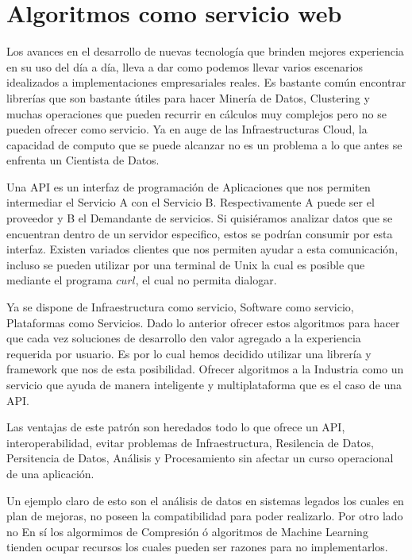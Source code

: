 \newpage
\section{Algoritmos como servicio web }

	Los avances en el desarrollo de nuevas tecnología que brinden mejores experiencia en su uso del día a día, lleva a dar como podemos llevar varios escenarios idealizados a implementaciones empresariales reales. Es bastante común encontrar librerías que son bastante útiles para hacer Minería de Datos, Clustering y muchas operaciones que pueden recurrir en cálculos muy complejos pero no se pueden ofrecer como servicio. Ya en auge de las Infraestructuras Cloud, la capacidad de computo que se puede alcanzar no es un problema a lo que antes se enfrenta un Cientista de Datos.


	Una API es un interfaz de programación de Aplicaciones que nos permiten intermediar el Servicio A con el Servicio B. Respectivamente A puede ser el proveedor y B el Demandante de servicios. Si quisiéramos analizar datos que se encuentran dentro de un servidor especifico, estos se podrían consumir por esta interfaz. Existen variados clientes que nos permiten ayudar a esta comunicación, incluso se pueden utilizar por una terminal de Unix la cual es posible que mediante el programa $curl$, el cual no permita dialogar.
	
	Ya se dispone de Infraestructura como servicio, Software como servicio, Plataformas como Servicios. Dado lo anterior ofrecer estos algoritmos para hacer que cada vez soluciones de desarrollo den valor agregado a la experiencia requerida por usuario. 
	Es por lo cual hemos decidido utilizar una librería y framework que nos de esta posibilidad. Ofrecer algoritmos a la Industria como un servicio que ayuda de manera inteligente y multiplataforma  que es el caso de una API. 
	
	Las ventajas de este patrón son heredados  todo lo que ofrece un API, interoperabilidad, evitar problemas de Infraestructura, Resilencia de Datos, Persitencia de Datos, Análisis y Procesamiento sin afectar un curso operacional de una aplicación.
	
	Un ejemplo claro de esto son el análisis de datos en sistemas legados los cuales en plan de mejoras, no poseen la compatibilidad para poder realizarlo. Por otro lado no En sí los algormimos de Compresión ó algoritmos de Machine Learning tienden ocupar recursos los cuales pueden ser razones para no implementarlos.
	
	
	
	